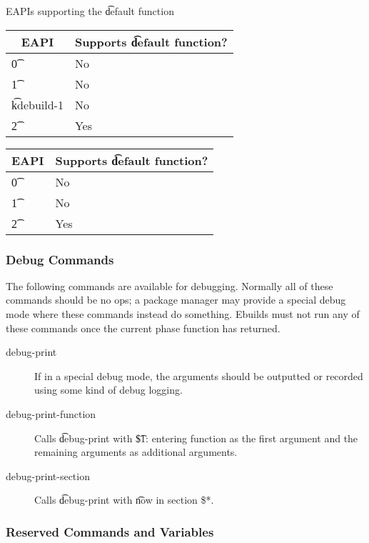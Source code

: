 \begin{centertable}{EAPIs supporting the \t{default} function} \label{default-function-table}
\IFKDEBUILDELSE
{
    \begin{tabular}{ l l }
        \toprule
            \multicolumn{1}{c}{\textbf{EAPI}} &
            \multicolumn{1}{c}{\textbf{Supports \t{default} function?}} \\
            \midrule
    \t{0} & No \\
    \t{1} & No \\
    \t{kdebuild-1} & No \\
    \t{2} & Yes \\
    \bottomrule
    \end{tabular}
}{
    \begin{tabular}{ l l }
        \toprule
            \multicolumn{1}{c}{\textbf{EAPI}} &
            \multicolumn{1}{c}{\textbf{Supports \t{default} function?}} \\
            \midrule
    \t{0} & No \\
    \t{1} & No \\
    \t{2} & Yes \\
    \bottomrule
    \end{tabular}
}
\end{centertable}

\subsubsection{Debug Commands}
The following commands are available for debugging. Normally all of these commands should be no ops;
a package manager may provide a special debug mode where these commands instead do something.
Ebuilds must not run any of these commands once the current phase function has returned.

\begin{description}
\item[debug-print] If in a special debug mode, the arguments should be outputted or recorded using
    some kind of debug logging.
\item[debug-print-function] Calls \t{debug-print} with \t{\$1: entering function} as the first
    argument and the remaining arguments as additional arguments.
\item[debug-print-section] Calls \t{debug-print} with \t{now in section \$*}.
\end{description}

\subsubsection{Reserved Commands and Variables}

